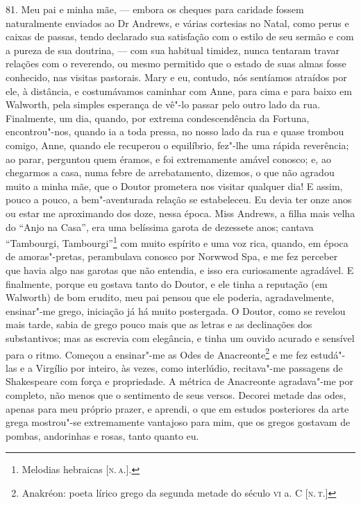 81. Meu pai e minha mãe, --- embora os cheques para caridade fossem
naturalmente enviados ao Dr Andrews, e várias cortesias no Natal, como
perus e caixas de passas, tendo declarado sua satisfação com o estilo de
seu sermão e com a pureza de sua doutrina, --- com sua habitual timidez,
nunca tentaram travar relações com o reverendo, ou mesmo permitido que o
estado de suas almas fosse conhecido, nas visitas pastorais. Mary e eu,
contudo, nós sentíamos atraídos por ele, à distância, e costumávamos
caminhar com Anne, para cima e para baixo em Walworth, pela simples
esperança de vê"-lo passar pelo outro lado da rua. Finalmente, um dia,
quando, por extrema condescendência da Fortuna, encontrou"-nos, quando ia
a toda pressa, no nosso lado da rua e quase trombou comigo, Anne, quando
ele recuperou o equilíbrio, fez"-lhe uma rápida reverência; ao parar,
perguntou quem éramos, e foi extremamente amável conosco; e, ao
chegarmos a casa, numa febre de arrebatamento, dizemos, o que não
agradou muito a minha mãe, que o Doutor prometera nos visitar qualquer
dia! E assim, pouco a pouco, a bem"-aventurada relação se estabeleceu. Eu
devia ter onze anos ou estar me aproximando dos doze, nessa época. Miss
Andrews, a filha mais velha do ``Anjo na Casa'', era uma belíssima
garota de dezessete anos; cantava ``Tambourgi, Tambourgi''\footnote{Melodias
  hebraicas {[}\textsc{n.\,a.}{]}.} com muito espírito e uma voz rica, quando,
em época de amoras"-pretas, perambulava conosco por Norwwod Spa, e me fez
perceber que havia algo nas garotas que não entendia, e isso era
curiosamente agradável. E finalmente, porque eu gostava tanto do Doutor,
e ele tinha a reputação (em Walworth) de bom erudito, meu pai pensou que
ele poderia, agradavelmente, ensinar"-me grego, iniciação já há muito
postergada. O Doutor, como se revelou mais tarde, sabia de grego pouco
mais que as letras e as declinações dos substantivos; mas as escrevia
com elegância, e tinha um ouvido acurado e sensível para o ritmo.
Começou a ensinar"-me as Odes de Anacreonte\footnote{Anakréon: poeta
  lírico grego da segunda metade do século \textsc{vi} a. C {[}\textsc{n.\,t.}{]}} e me
fez estudá"-las e a Virgílio por inteiro, às vezes, como interlúdio,
recitava"-me passagens de Shakespeare com força e propriedade. A métrica
de Anacreonte agradava"-me por completo, não menos que o sentimento de
seus versos. Decorei metade das odes, apenas para meu próprio prazer, e
aprendi, o que em estudos posteriores da arte grega mostrou"-se
extremamente vantajoso para mim, que os gregos gostavam de pombas,
andorinhas e rosas, tanto quanto eu.

